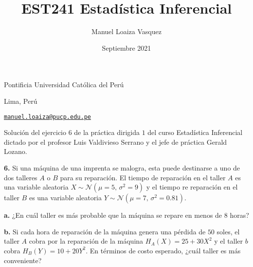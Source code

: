 \documentclass{article}
\title{EST241 Estad\'istica Inferencial}
\author{Manuel Loaiza Vasquez}
\date{Septiembre 2021}
\newenvironment{statement}[1]{\smallskip\noindent\color[rgb]{1.00,0.00,0.50} {\bf #1.}}{}
\theoremstyle{definition}
\theoremstyle{remark}
\begin{document}
\maketitle

\vspace*{-0.25in}
\centerline{Pontificia Universidad Cat\'olica del Per\'u}
\centerline{Lima, Per\'u}
\centerline{\href{mailto:manuel.loaiza@pucp.edu.pe}{{\tt manuel.loaiza@pucp.edu.pe}}}
\vspace*{0.15in}

\begin{framed}
  Soluci\'on del ejercicio $6$ de la pr\'actica dirigida $1$ del curso
  Estad\'istica Inferencial dictado por el profesor Luis Valdivieso Serrano
  y el jefe de pr\'actica Gerald Lozano.
\end{framed}

\begin{statement}{6}
  Si una m\'aquina de una imprenta se malogra, esta puede destinarse a uno de
  dos talleres $A$ o $B$ para su reparaci\'on.
  El tiempo de reparaci\'on en el taller $A$ es una variable aleatoria
  $X \sim \mathcal{N}(\mu = 5,\,\sigma^2 = 9)$ y el tiempo re reparaci\'on en el
  taller $B$ es una variable aleatoria $Y \sim \mathcal{N}(\mu = 7,\,\sigma^2 = 0.81)$.
\end{statement}

\begin{statement}{a}
  ¿En cu\'al taller es m\'as probable que la m\'aquina se repare en menos de $8$ horas?
\end{statement}

\begin{statement}{b}
  Si cada hora de reparaci\'on de la m\'aquina genera una p\'erdida de $50$
  soles, el taller $A$ cobra por la reparaci\'on de la m\'aquina
  $H_A(X) = 25 + 30 X^2$ y el taller $b$ cobra $H_B(Y) = 10 + 20 Y^2$.
  En t\'erminos de costo esperado, ¿cu\'al taller es m\'as conveniente?
\end{statement}
\end{document}
